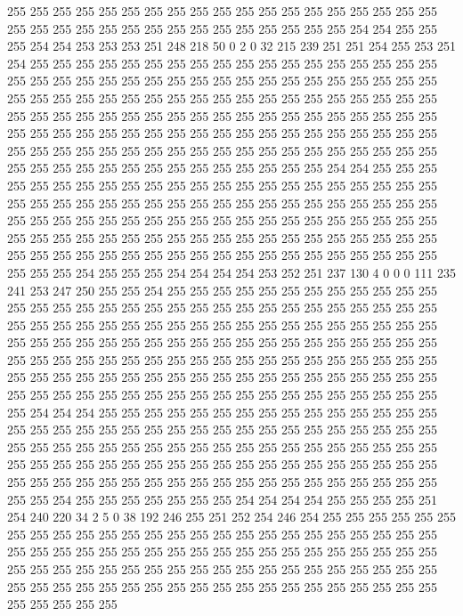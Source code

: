 255 255 255 255 255 255 255 255 255 255 255 255 255 255 255 255 255 255 255 255
255 255 255 255 255 255 255 255 255 255 255 255 255 255 254 254 255 255 255 254
254 253 253 253 251 248 218 50 0 2 0 32 215 239 251 251 254 255 253 251
254 255 255 255 255 255 255 255 255 255 255 255 255 255 255 255 255 255 255 255
255 255 255 255 255 255 255 255 255 255 255 255 255 255 255 255 255 255 255 255
255 255 255 255 255 255 255 255 255 255 255 255 255 255 255 255 255 255 255 255
255 255 255 255 255 255 255 255 255 255 255 255 255 255 255 255 255 255 255 255
255 255 255 255 255 255 255 255 255 255 255 255 255 255 255 255 255 255 255 255
255 255 255 255 255 255 255 255 255 255 255 255 255 255 255 255 255 255 255 255
255 255 255 255 255 255 255 255 254 254 255 255 255 255 255 255 255 255 255 255
255 255 255 255 255 255 255 255 255 255 255 255 255 255 255 255 255 255 255 255
255 255 255 255 255 255 255 255 255 255 255 255 255 255 255 255 255 255 255 255
255 255 255 255 255 255 255 255 255 255 255 255 255 255 255 255 255 255 255 255
255 255 255 255 255 255 255 255 255 255 255 255 255 255 255 255 255 255 255 255
255 255 255 255 255 255 255 255 255 255 255 254 255 255 255 254 254 254 254 253
252 251 237 130 4 0 0 0 111 235 241 253 247 250 255 255 254 255 255 255
255 255 255 255 255 255 255 255 255 255 255 255 255 255 255 255 255 255 255 255
255 255 255 255 255 255 255 255 255 255 255 255 255 255 255 255 255 255 255 255
255 255 255 255 255 255 255 255 255 255 255 255 255 255 255 255 255 255 255 255
255 255 255 255 255 255 255 255 255 255 255 255 255 255 255 255 255 255 255 255
255 255 255 255 255 255 255 255 255 255 255 255 255 255 255 255 255 255 255 255
255 255 255 255 255 255 255 255 255 255 255 255 255 255 255 255 255 255 255 255
255 255 255 255 254 254 254 255 255 255 255 255 255 255 255 255 255 255 255 255
255 255 255 255 255 255 255 255 255 255 255 255 255 255 255 255 255 255 255 255
255 255 255 255 255 255 255 255 255 255 255 255 255 255 255 255 255 255 255 255
255 255 255 255 255 255 255 255 255 255 255 255 255 255 255 255 255 255 255 255
255 255 255 255 255 255 255 255 255 255 255 255 255 255 255 255 255 255 255 255
254 255 255 255 255 255 255 255 254 254 254 254 255 255 255 255 251 254 240 220
34 2 5 0 38 192 246 255 251 252 254 246 254 255 255 255 255 255 255 255
255 255 255 255 255 255 255 255 255 255 255 255 255 255 255 255 255 255 255 255
255 255 255 255 255 255 255 255 255 255 255 255 255 255 255 255 255 255 255 255
255 255 255 255 255 255 255 255 255 255 255 255 255 255 255 255 255 255 255 255
255 255 255 255 255 255 255 255 255 255 255 255 255 255 255 255 255 255 255 255
